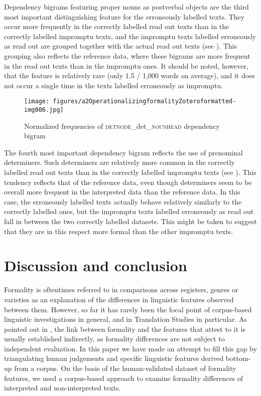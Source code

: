 \documentclass[output=paper]{langscibook}
\begin{document}
Dependency bigrams featuring proper nouns as postverbal objects are the third most important distinguishing feature for the erroneously labelled texts. They occur more frequently in the correctly labelled read out texts than in the correctly labelled impromptu texts, and the impromptu texts labelled erroneously as read out are grouped together with the actual read out texts (see ). This grouping also reflects the reference data, where these bigrams are more frequent in the read out texts than in the impromptu ones. It should be noted, however, that the feature is relatively rare (only 1.5 / 1,000 words on average), and it does not occur a single time in the texts labelled erroneously as impromptu.

\begin{figure}

\texttt{[image: figures/a2OperationalizingformalityZoteroformatted-img006.jpg]}
 
\caption{Normalized frequencies of \textsc{detnode}\_det\_\textsc{nounhead} dependency bigram}
\label{fig:ivaska:6}
\end{figure}

The fourth most important dependency bigram reflects the use of prenominal determiners. Such determiners are relatively more common in the correctly labelled read out texts than in the correctly labelled impromptu texts (see ). This tendency reflects that of the reference data, even though determiners seem to be overall more frequent in the interpreted data than the reference data. In this case, the erroneously labelled texts actually behave relatively similarly to the correctly labelled ones, but the impromptu texts labelled erroneously as read out fall in between the two correctly labelled datasets. This might be taken to suggest that they are in this respect more formal than the other impromptu texts.



\section{Discussion and conclusion}\label{sec:ivaska:5}

Formality is oftentimes referred to in comparisons across registers, genres or varieties as an explanation of the differences in linguistic features observed between them. However, so far it has rarely been the focal point of corpus-based linguistic investigations in general, and in Translation Studies in particular. As pointed out in , the link between formality and the features that attest to it is usually established indirectly, as formality differences are not subject to independent evaluation. In this paper we have made an attempt to fill this gap by triangulating human judgements and specific linguistic features derived bottom-up from a corpus. On the basis of the human-validated dataset of formality features, we used a corpus-based approach to examine formality differences of interpreted and non-interpreted texts.
\end{document}
